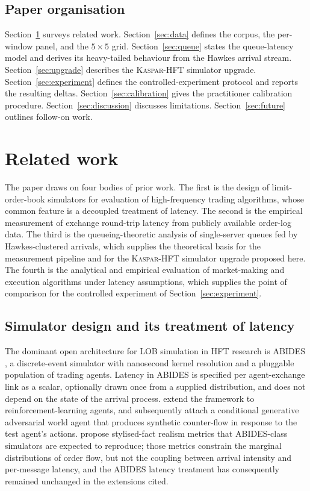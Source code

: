 \documentclass[11pt]{article}
\newcommand{\kasparhft}{\textsc{Kaspar-HFT}}
\begin{document}
\subsection{Paper organisation}
\label{sec:organisation}

Section~\ref{sec:related} surveys related work. Section~\ref{sec:data} defines the corpus, the per-window panel, and the $5 \times 5$ grid. Section~\ref{sec:queue} states the queue-latency model and derives its heavy-tailed behaviour from the Hawkes arrival stream. Section~\ref{sec:upgrade} describes the \kasparhft{} simulator upgrade. Section~\ref{sec:experiment} defines the controlled-experiment protocol and reports the resulting deltas. Section~\ref{sec:calibration} gives the practitioner calibration procedure. Section~\ref{sec:discussion} discusses limitations. Section~\ref{sec:future} outlines follow-on work.

\section{Related work}
\label{sec:related}

The paper draws on four bodies of prior work. The first is the design of limit-order-book simulators for evaluation of high-frequency trading algorithms, whose common feature is a decoupled treatment of latency. The second is the empirical measurement of exchange round-trip latency from publicly available order-log data. The third is the queueing-theoretic analysis of single-server queues fed by Hawkes-clustered arrivals, which supplies the theoretical basis for the measurement pipeline and for the \kasparhft{} simulator upgrade proposed here. The fourth is the analytical and empirical evaluation of market-making and execution algorithms under latency assumptions, which supplies the point of comparison for the controlled experiment of Section~\ref{sec:experiment}.

\subsection{Simulator design and its treatment of latency}
\label{sec:related-sim}

The dominant open architecture for LOB simulation in HFT research is ABIDES \citep{byrd2020abides}, a discrete-event simulator with nanosecond kernel resolution and a pluggable population of trading agents. Latency in ABIDES is specified per agent-exchange link as a scalar, optionally drawn once from a supplied distribution, and does not depend on the state of the arrival process. \citet{amrouni2021abidesgym} extend the framework to reinforcement-learning agents, and \citet{coletta2022cgan} subsequently attach a conditional generative adversarial world agent that produces synthetic counter-flow in response to the test agent's actions. \citet{vyetrenko2020getreal} propose stylised-fact realism metrics that ABIDES-class simulators are expected to reproduce; those metrics constrain the marginal distributions of order flow, but not the coupling between arrival intensity and per-message latency, and the ABIDES latency treatment has consequently remained unchanged in the extensions cited.
\end{document}
